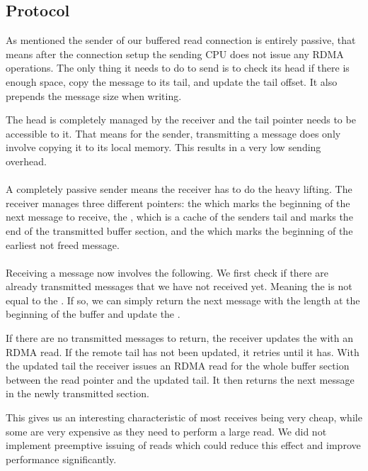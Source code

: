 \subsection{Protocol}
As mentioned the sender of our buffered read connection is entirely passive, that means after the connection setup the sending
CPU does not issue any RDMA operations. The only thing it needs to do to send is to check its head if there is enough space,
copy the message to its tail, and update the tail offset.  It also prepends the message size when  writing. 

The head is completely managed by the receiver and the tail pointer needs to be accessible to it. That means for the sender,
transmitting a message does only involve copying it to its local memory. This results in
a very low sending overhead.

\paragraph{} A completely passive sender means the receiver has to do the heavy lifting. The receiver manages three different pointers: 
the  which marks the beginning of the next message to receive, the , which is a cache of
the senders tail and marks the end of the transmitted buffer section, and the  which marks the beginning of 
the earliest not freed message.

\paragraph{} Receiving a message now involves the following. We first check if there are already transmitted messages that 
we have not received yet. Meaning the  is not equal to the . If so, we can simply 
return the next message with the length at the beginning of the buffer and update the .

If there are no transmitted messages to return, the receiver updates the  with an RDMA read. If the remote
tail has not been updated, it retries until it has. With the updated tail the receiver issues an RDMA read for the whole buffer 
section between the read pointer and the updated tail. It then returns the next message in the newly transmitted section.

This gives us an interesting characteristic of most receives being very cheap, while some are very expensive as they need to 
perform a large read. We did not implement preemptive issuing of reads which could reduce this effect and improve performance
significantly.

